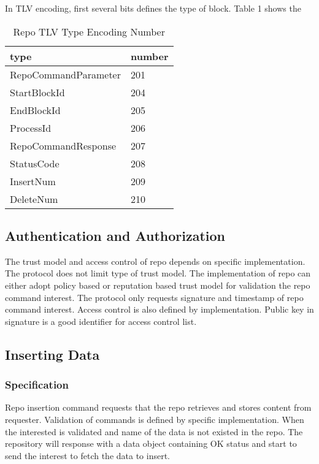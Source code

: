 \documentclass{acm_proc_article-sp}
\begin{document}
In TLV encoding, first several bits defines the type of block. Table 1 shows the 

\begin{table}[!hbp]
\centering

\begin{tabular}{l l}

\hline
type & number \\
\hline
RepoCommandParameter & 201 \\
StartBlockId & 204 \\
EndBlockId & 205 \\
ProcessId & 206 \\
RepoCommandResponse & 207\\
StatusCode & 208 \\
InsertNum & 209 \\
DeleteNum & 210 \\
\hline

\end{tabular}
\caption{Repo TLV Type Encoding Number}
\end{table}



\subsection{Authentication and Authorization}
The trust model and access control of repo depends on specific implementation. The protocol does not limit type of trust model. The implementation of repo can either adopt policy based or reputation based trust model for validation the repo command interest. The protocol only requests signature and timestamp of repo command interest. Access control is also defined by implementation. Public key in signature is a good identifier for access control list.

\subsection{Inserting Data}

\subsubsection{Specification}
Repo insertion command requests that the repo retrieves and stores content from requester. Validation of commands is defined by specific implementation. When the interested is validated and name of the data is not existed in the repo. The repository will response with a data object containing OK status and start to send the interest to fetch the data to insert.
\end{document}
